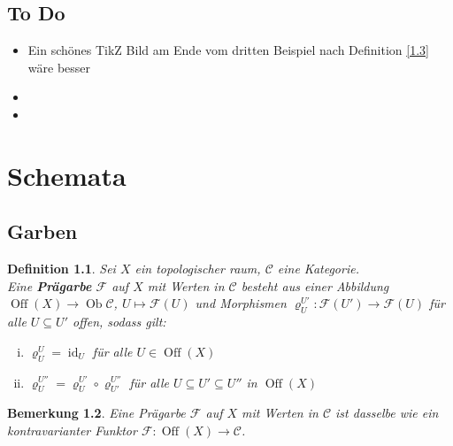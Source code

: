 \documentclass[a4paper,12pt]{report}
\theoremstyle{break}
\newtheorem{Def}{Definition}[section]
\newtheorem{Bem}[Def]{Bemerkung}
\theoremstyle{nonumberbreak}
\theoremstyle{nonumberplain}
\newcommand{\emp}[1]{\textbf{\emph{#1}}}
\newcommand{\defterm}[1]{{\index{#1}}\emp{#1}}
\DeclareMathOperator{\Off}{Off}
\DeclareMathOperator{\Ob}{Ob}
\DeclareMathOperator{\id}{id}
\begin{document}
\section*{To Do}\begin{itemize}
\item
	Ein sch\"ones TikZ Bild am Ende vom dritten Beispiel nach Definition \ref{1.3} w\"are besser
\item
\item
\end{itemize}


\chapter{Schemata}

\section{Garben}

\begin{Def}
Sei $X$ ein topologischer raum, $\mathcal C$ eine Kategorie.\\
Eine \defterm{Pr\"agarbe} $\mathcal F$ auf $X$ mit Werten in $\mathcal C$ besteht aus einer Abbildung $\Off(X) \to \Ob \mathcal C$, $U \mapsto \mathcal F(U)$ und Morphismen $\varrho_U^{U'}: \mathcal F(U') \to \mathcal F(U)$ f\"ur alle $U\subseteq U'$ offen, sodass gilt:
\begin{enumerate}[i)]
\item
	$\varrho_U^U = \id_U$ f\"ur alle $U\in \Off(X)$
\item
	$\varrho_U^{U''} = \varrho_U^{U'} \circ \varrho_{U'}^{U''}$ f\"ur alle $U\subseteq U' \subseteq U''$ in $\Off(X)$
\end{enumerate}\end{Def}

\begin{Bem}
Eine Pr\"agarbe $\mathcal F$ auf $X$ mit Werten in $\mathcal C$ ist dasselbe wie ein kontravarianter Funktor $\mathcal F: \Off(X) \to \mathcal C$.
\end{Bem}
\end{document}
